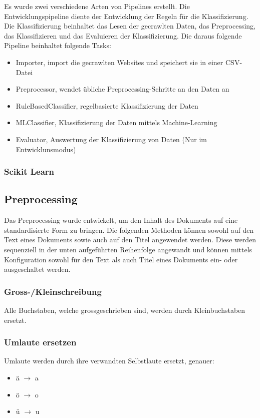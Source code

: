 Es wurde zwei verschiedene Arten von Pipelines erstellt.
Die Entwicklungspipeline diente der Entwicklung der Regeln für die Klassifizierung.
Die Klassifizierung beinhaltet das Lesen der gecrawlten Daten, das Preprocessing, das Klassifizieren und das Evaluieren der Klassifizierung.
Die daraus folgende Pipeline beinhaltet folgende Tasks:
\begin{itemize}
	\item Importer, import die gecrawlten Websites und speichert sie in einer CSV-Datei
	\item Preprocessor, wendet übliche Preprocessing-Schritte an den Daten an
	\item RuleBasedClassifier, regelbasierte Klassifizierung der Daten 
	\item MLClassifier, Klassifizierung der Daten mittels Machine-Learning
	\item Evaluator, Auswertung der Klassifizierung von Daten (Nur im Entwicklunsmodus)
\end{itemize}
\subsubsection{Scikit Learn}
\subsection{Preprocessing}
Das Preprocessing wurde entwickelt, um den Inhalt des Dokuments auf eine standardisierte Form zu bringen.
Die folgenden Methoden können sowohl auf den Text eines Dokuments sowie auch auf den Titel angewendet werden.
Diese werden sequenziell in der unten aufgeführten Reihenfolge angewandt und können mittels Konfiguration sowohl für den Text als auch Titel eines Dokuments ein- oder ausgeschaltet werden.
\subsubsection{Gross-/Kleinschreibung}
Alle Buchstaben, welche grossgeschrieben sind, werden durch Kleinbuchstaben ersetzt.
\subsubsection{Umlaute ersetzen}
Umlaute werden durch ihre verwandten Selbstlaute ersetzt, genauer:
\begin{itemize}
	\item ä $\rightarrow$ a
	\item ö $\rightarrow$ o
	\item ü $\rightarrow$ u
\end{itemize} 
